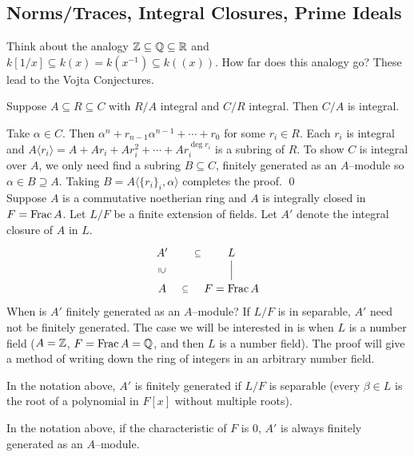 \newpage
\subsection{Norms/Traces, Integral Closures, Prime Ideals\label{sec:620_2}}

\tb Think about the analogy $\mathbb{Z} \subseteq \mathbb{Q} \subseteq \mathbb{R}$ and $k[1/x] \subseteq k(x)=k(x^{-1}) \subseteq k(\!(x)\!)$. How far does this analogy go? These lead to the Vojta Conjectures.


\begin{prop}
Suppose $A \subseteq R \subseteq C$ with $R/A$ integral and $C/R$ integral. Then $C/A$ is integral. 
\end{prop}

\pf Take $\alpha \in C$. Then $\alpha^n + r_{n-1} \alpha^{n-1} + \cdots+ r_0$ for some $r_i \in R$. Each $r_i$ is integral and $A\langle r_i \rangle = A+ Ar_i+Ar_i^2+\cdots+Ar_i^{\deg r_i}$ is a subring of $R$. To show $C$ is integral over $A$, we only need find a subring $B \subseteq C$, finitely generated as an $A$--module so $\alpha \in B \supseteq A$. Taking $B=A \langle \{r_i\}_i,\alpha \rangle$ completes the proof. \qed \\


\tb Suppose $A$ is a commutative noetherian ring and $A$ is integrally closed in $F=\operatorname{Frac} A$. Let $L/F$ be a finite extension of fields. Let $A'$ denote the integral closure of $A$ in $L$. 
	\[
	\begin{tikzcd}
	 A' \arrow[draw=none]{d}[sloped,auto=false]{\supseteq} \arrow[draw=none]{r}[sloped,auto=false]{\subseteq} & L \arrow[dash]{d} \\
	A \arrow[draw=none]{r}[sloped,auto=false]{\subseteq} & F=\Frac A
	\end{tikzcd}
	\]
When is $A'$ finitely generated as an $A$--module? If $L/F$ is in separable, $A'$ need not be finitely generated. The case we will be interested in is when $L$ is a number field ($A=\mathbb{Z}$, $F=\operatorname{Frac} A=\mathbb{Q}$, and then $L$ is a number field). The proof will give a method of writing down the ring of integers in an arbitrary number field. 

\begin{thm}
In the notation above, $A'$ is finitely generated if $L/F$ is separable (every $\beta \in L$ is the root of a polynomial in $F[x]$ without multiple roots). 
\end{thm}

\begin{cor}
In the notation above, if the characteristic of $F$ is 0, $A'$ is always finitely generated as an $A$--module. 
\end{cor}

